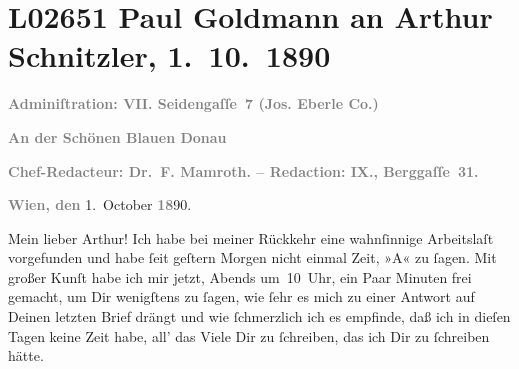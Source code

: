 

\section[Paul Goldmann an Arthur Schnitzler, 1. 10. 1890]{L02651 Paul Goldmann an Arthur Schnitzler, 1. 10. 1890}
\nopagebreak{}
\rehead{ }\normalsize\beginnumbering{}
\toendnotes[C]{\smallbreak\pagebreak[2]}
\toendnotes[C]{\smallbreak}
\pstart
           \centering{}{\pb}\textcolor{gray}{\textbf{\textbf{Adminiſtration: VII.
                           Seidengaſſe 7} (Jos. Eberle {\kaufmannsund} Co.)}}\pend
           
\pstart
           \centering{}\textcolor{gray}{\textbf{An der Schönen Blauen Donau}}\pend
           
\pstart
           \centering{}\textcolor{gray}{\textbf{Chef-Redacteur: Dr. F.
                        Mamroth. – Redaction: IX.,
                        Berggaſſe 31.}}\pend
           
\pstart
           \raggedleft{}\textcolor{gray}{\textbf{Wien, den}}{ }1. October \textcolor{gray}{\textbf{18}}90.\pend
           
\pstart\center{}Mein lieber Arthur!\pend\vspace{0.5em}
\pstart
           Ich habe bei meiner Rückkehr eine wahnſinnige Arbeitslaſt vorgefunden und habe ſeit
                  geſtern{ }Morgen nicht einmal Zeit, »A« zu ſagen. Mit großer Kunſt habe ich mir
               jetzt, Abends um 10 Uhr, ein\strikeout{\textcolor{gray}{e Pa}} Paar Minuten frei gemacht, um Dir wenigſtens zu ſagen, wie ſehr es mich zu
               einer Antwort auf Deinen letzten Brief drängt und wie ſchmerzlich ich es empfinde,
               daß ich in dieſen Tagen keine Zeit habe, all’ das Viele {\pb}Dir zu ſchreiben, das ich Dir zu ſchreiben
               hätte.\pend
           

